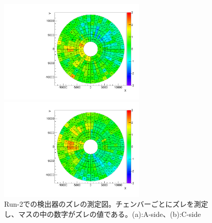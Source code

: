 \begin{figure}
    \begin{minipage}[tb]{0.4\linewidth}
        \centering
        \includegraphics[clip, width=7cm]{fig/3/TGCAlign_CW.muon.bias.20160606.v1.A-side.pdf}
        \vspace{10pt}
        \subcaption{}
    \end{minipage}
    \hfill
    \begin{minipage}[tb]{0.4\linewidth}
        \centering
        \includegraphics[clip, width=7cm]{fig/3/TGCAlign_CW.muon.bias.20160606.v1.C-side.pdf}
        \vspace{10pt}
        \subcaption{}
    \end{minipage}
    \caption{Run-2での検出器のズレの測定図。チェンバーごとにズレを測定し、マスの中の数字がズレの値である。(a):A-side、(b):C-side}
    \label{fig:ズレ}
\end{figure}
